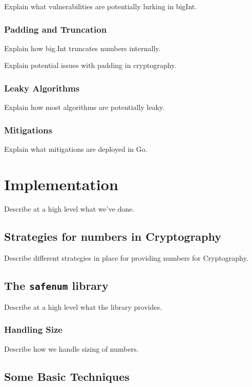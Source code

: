 \documentclass[11pt, a4paper, twocolumn]{article} %
\begin{document}
{Explain what vulnerabilities are potentially lurking in bigInt.

\subsubsection{Padding and Truncation}

Explain how big.Int truncates numbers internally.

Explain potential issues with padding in cryptography.

\subsubsection{Leaky Algorithms}

Explain how most algorithms are potentially leaky.

\subsubsection{Mitigations}

Explain what mitigations are deployed in Go.

\section{Implementation}

Describe at a high level what we've done.

\subsection{Strategies for numbers in Cryptography}

Describe different strategies in place for providing numbers for
Cryptography.

\subsection{The \texttt{safenum} library}

Describe at a high level what the library provides.

\subsubsection{Handling Size}

Describe how we handle sizing of numbers.

\subsection{Some Basic Techniques}

}
\end{document}
